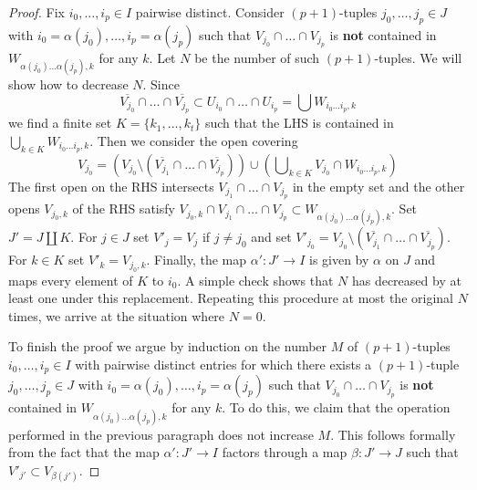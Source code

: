 \begin{proof}
\medskip\noindent
Fix $i_0, \ldots, i_p \in I$ pairwise distinct. Consider $(p + 1)$-tuples
$j_0, \ldots, j_p \in J$ with $i_0 = \alpha(j_0), \ldots, i_p = \alpha(j_p)$
such that $V_{j_0} \cap \ldots \cap V_{j_p}$
is {\bf not} contained in $W_{\alpha(j_0) \ldots \alpha(j_p), k}$ for any $k$.
Let $N$ be the number of such $(p + 1)$-tuples. We will show how to decrease
$N$. Since
$$
\overline{V_{j_0}} \cap \ldots \cap \overline{V_{j_p}} \subset
U_{i_0} \cap \ldots \cap U_{i_p} = \bigcup W_{i_0 \ldots i_p, k}
$$
we find a finite set $K = \{k_1, \ldots, k_t\}$ such that the LHS
is contained in $\bigcup_{k \in K} W_{i_0 \ldots i_p, k}$.
Then we consider the open covering
$$
V_{j_0} =
(V_{j_0} \setminus (\overline{V_{j_1}} \cap \ldots \cap \overline{V_{j_p}}))
\cup (\bigcup\nolimits_{k \in K} V_{j_0} \cap W_{i_0 \ldots i_p, k})
$$
The first open on the RHS intersects $V_{j_1} \cap \ldots \cap V_{j_p}$
in the empty set and the other opens $V_{j_0, k}$ of the RHS
satisfy $V_{j_0, k} \cap V_{j_1} \cap \ldots \cap V_{j_p} \subset
W_{\alpha(j_0) \ldots \alpha(j_p), k}$.
Set $J' = J \amalg K$. For $j \in J$ set $V'_j = V_j$ if $j \not = j_0$
and set $V'_{j_0} =
V_{j_0} \setminus (\overline{V_{j_1}} \cap \ldots \cap \overline{V_{j_p}})$.
For $k \in K$ set $V'_k = V_{j_0, k}$. Finally, the map $\alpha' : J' \to I$
is given by $\alpha$ on $J$ and maps every element of $K$ to $i_0$.
A simple check shows that $N$ has decreased by at least one under this
replacement. Repeating this procedure at most the original $N$ times,
we arrive at the situation where $N = 0$.

\medskip\noindent
To finish the proof we argue by induction on the number $M$ of $(p + 1)$-tuples
$i_0, \ldots, i_p \in I$ with pairwise distinct entries for which there exists
a $(p + 1)$-tuple $j_0, \ldots, j_p \in J$ with
$i_0 = \alpha(j_0), \ldots, i_p = \alpha(j_p)$ such that
$V_{j_0} \cap \ldots \cap V_{j_p}$ is {\bf not} contained in
$W_{\alpha(j_0) \ldots \alpha(j_p), k}$ for any $k$. To do this, we
claim that the operation performed in the previous paragraph does not
increase $M$. This follows formally from the fact that the map
$\alpha' : J' \to I$ factors through a map $\beta : J' \to J$
such that $V'_{j'} \subset V_{\beta(j')}$.
\end{proof}

